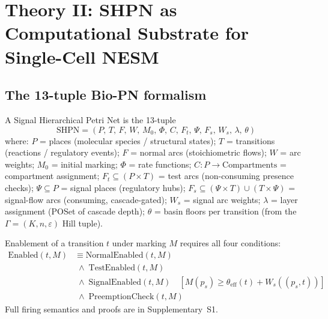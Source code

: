\documentclass[11pt,a4paper]{article}
\newcommand{\thetaeff}{\theta_{\mathrm{eff}}}
\begin{document}
\section{Theory II: SHPN as Computational Substrate for Single-Cell NESM}
\label{sec:shpn}

\subsection{The 13-tuple Bio-PN formalism}

A Signal Hierarchical Petri Net is the 13-tuple
\begin{equation}
  \mathrm{SHPN} = (P,\, T,\, F,\, W,\, M_0,\, \Phi,\, C,\,
                   F_t,\, \Psi,\, F_s,\, W_s,\, \lambda,\, \theta)
  \label{eq:shpn_tuple}
\end{equation}
where: $P$ = places (molecular species / structural states);
$T$ = transitions (reactions / regulatory events);
$F$ = normal arcs (stoichiometric flows);
$W$ = arc weights;
$M_0$ = initial marking;
$\Phi$ = rate functions;
$C: P \to \text{Compartments}$ = compartment assignment;
$F_t \subseteq (P\times T)$ = test arcs (non-consuming presence checks);
$\Psi \subseteq P$ = signal places (regulatory hubs);
$F_s \subseteq (\Psi \times T) \cup (T \times \Psi)$ = signal-flow arcs
(consuming, cascade-gated);
$W_s$ = signal arc weights;
$\lambda$ = layer assignment (POSet of cascade depth);
$\theta$ = basin floors per transition (from the $\Gamma = (K,n,\varepsilon)$
Hill tuple).

Enablement of a transition $t$ under marking $M$ requires all four
conditions:
\begin{align}
  \mathrm{Enabled}(t,M) &\equiv
    \mathrm{NormalEnabled}(t,M) \nonumber \\
  &\;\wedge\; \mathrm{TestEnabled}(t,M) \nonumber \\
  &\;\wedge\; \mathrm{SignalEnabled}(t,M)
    \quad [M(p_s) \geq \thetaeff(t) + W_s((p_s,t))] \nonumber \\
  &\;\wedge\; \mathrm{PreemptionCheck}(t,M)
  \label{eq:enablement}
\end{align}
Full firing semantics and proofs are in Supplementary~S1.
\end{document}
